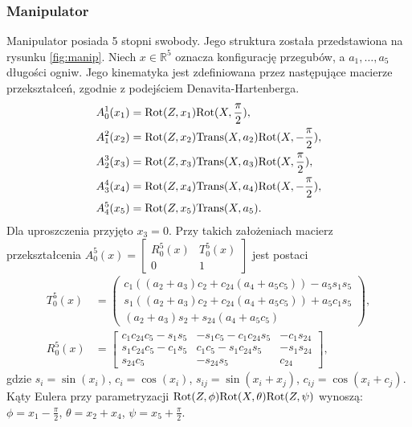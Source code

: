 \subsubsection{Manipulator}
\hspace{\parindent}Manipulator posiada 5 stopni swobody. Jego struktura została przedstawiona na rysunku \ref{fig:manip}. Niech $x\in \mathbb{R}^5$ oznacza konfigurację przegubów, a $a_1, \dots, a_5$ długości ogniw. Jego kinematyka jest zdefiniowana przez następujące macierze przekształceń, zgodnie z podejściem Denavita-Hartenberga.
\begin{equation}
\begin{aligned}
A_0^1(x_1) &= \mathrm{Rot}(Z, x_1)\mathrm{Rot}(X, \frac{\pi}{2}),\\
A_1^2(x_2) &= \mathrm{Rot}(Z, x_2)\mathrm{Trans} (X, a_2)\mathrm{Rot}(X, -\frac{\pi}{2}),\\
A_2^3(x_3) &= \mathrm{Rot}(Z, x_3)\mathrm{Trans} (X, a_3)\mathrm{Rot}(X, \frac{\pi}{2}),\\
A_3^4(x_4) &= \mathrm{Rot}(Z, x_4)\mathrm{Trans} (X, a_4)\mathrm{Rot}(X, -\frac{\pi}{2}),\\
A_4^5(x_5) &= \mathrm{Rot}(Z, x_5)\mathrm{Trans} (X, a_5).
\end{aligned}
\end{equation}
Dla uproszczenia przyjęto $x_3=0$. Przy takich założeniach macierz przekształcenia $
A_0^5(x)=\begin{bmatrix}
R_0^5(x) & T_0^5(x)\\
0 & 1
\end{bmatrix}$ jest postaci
\begin{align}
T_0^5(x) &= \begin{pmatrix}
c_1\left((a_2+a_3)c_2 + c_{24}(a_4+a_5c_5)\right) - a_5s_1s_5\\
s_1\left((a_2+a_3)c_2 + c_{24}(a_4+a_5c_5)\right) + a_5c_1s_5\\
    (a_2+a_3)s_2 + s_{24}(a_4+a_5c_5)
\end{pmatrix},\\
R_0^5(x) &= \begin{bmatrix}
c_1c_{24}c_5-s_1s_5 & -s_1c_5-c_1c_{24}s_5 & -c_1s_{24}\\
s_1c_{24}c_5-c_1s_5 &  c_1c_5-s_1c_{24}s_5 & -s_1s_{24}\\
s_{24}c_5           & -s_{24}s_5           &  c_{24}
\end{bmatrix},
\end{align}
gdzie $s_i = \sin(x_i)$, $c_i=\cos(x_i)$, $s_{ij}=\sin(x_i+x_j)$,
$c_{ij}=\cos(x_i+c_j)$.
Kąty Eulera przy parametryzacji $\mathrm{Rot}(Z,\phi)\mathrm{Rot}(X, \theta)\mathrm{Rot}(Z, \psi)$ wynoszą: $\phi=x_1-\frac{\pi}{2}$, $\theta=x_2+x_4$, $\psi=x_5+\frac{\pi}{2}$.

